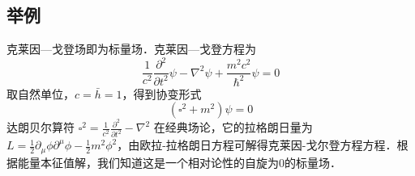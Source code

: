 \subsection{举例}
克莱因—戈登场即为标量场．克莱因—戈登方程为
\begin{equation}
\frac{1}{c^{2}} \frac{\partial^{2}}{\partial t^{2}} \psi-\nabla^{2} \psi+\frac{m^{2} c^{2}}{\hbar^{2}} \psi=0
\end{equation}
取自然单位，$c=\bar{h}=1$，得到协变形式
\begin{equation}
\left(\square^{2}+m^{2}\right) \psi=0
\end{equation}
达朗贝尔算符 $\square^{2}=\frac{1}{c^{2}} \frac{\partial^{2}}{\partial t^{2}}-\nabla^{2}$
在经典场论，它的拉格朗日量为 $L=\frac{1}{2} \partial_{\mu} \phi \partial^{\mu} \phi-\frac{1}{2} m^{2} \phi^{2}$，由欧拉-拉格朗日方程可解得克莱因-戈尔登方程方程．根据能量本征值解，我们知道这是一个相对论性的自旋为0的标量场．
